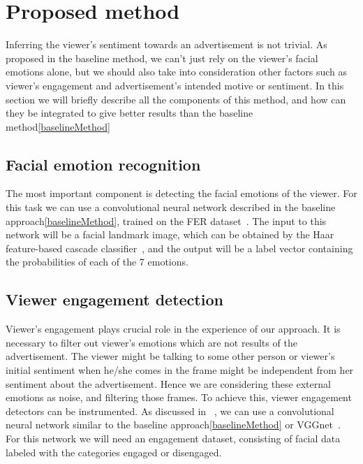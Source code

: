\documentclass[10pt,twocolumn,letterpaper]{article}
\begin{document}
\section{Proposed method}

Inferring the viewer's sentiment towards an advertisement is not trivial. As proposed in the baseline method, we can't just rely on the viewer's facial emotions alone, but we should also take into consideration other factors such as viewer's engagement and advertisement's intended motive or sentiment. In this section we will briefly describe all the components of this method, and how can they be integrated to give better results than the baseline method\ref{baselineMethod}

\subsection{Facial emotion recognition} \label{FER}

The most important component is detecting the facial emotions of the viewer. For this task we can use a convolutional neural network described in the baseline approach\ref{baselineMethod}, trained on the FER dataset~\cite{FER2013}. The input to this network will be a facial landmark image, which can be obtained by the Haar feature-based cascade classifier~\cite{HaarCascade}, and the output will be a label vector containing the probabilities of each of the 7 emotions.


\subsection{Viewer engagement detection} \label{VER}

Viewer's engagement plays crucial role in the experience of our approach. It is necessary to filter out viewer's emotions which are not results of the advertisement. The viewer might be talking to some other person or viewer's initial sentiment when he/she comes in the frame might be independent from her sentiment about the advertisement. Hence we are considering these external emotions as noise, and filtering those frames. To achieve this, viewer engagement detectors can be instrumented. As discussed in ~\cite{Nezami2018AutomaticRO}, we can use a convolutional neural network similar to the baseline approach\ref{baselineMethod} or VGGnet~\cite{Simonyan2014VeryDC}. For this network we will need an engagement dataset, consisting of facial data labeled with the categories engaged or disengaged.
\end{document}
